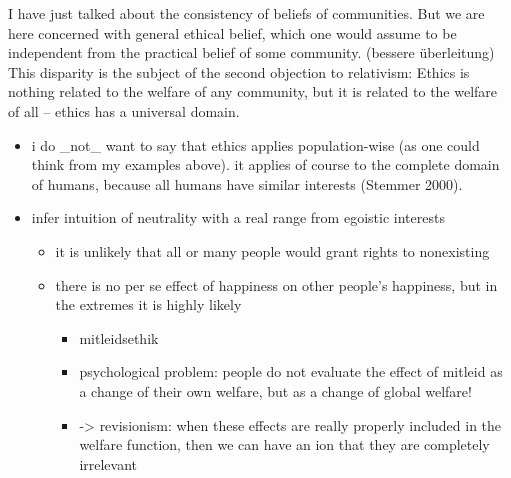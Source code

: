 I have just talked about the consistency of beliefs of communities. But we are here concerned with general ethical belief, which one would assume to be independent from the practical belief of some community. (bessere überleitung) This disparity is the subject of the second objection to relativism: Ethics is nothing related to the welfare of any community, but it is related to the welfare of all – ethics has a universal domain.  

\begin{itemize} \item i do \_not\_ want to say that ethics applies population-wise (as one could think from my examples above). it applies of course to the complete domain of humans, because all humans have similar interests (\label{ref:RNDitrDlHBuIn}Stemmer 2000). \item infer intuition of neutrality with a real range from egoistic interests 

\begin{itemize} \item it is unlikely that all or many people would grant rights to nonexisting \item there is no per se effect of happiness on other people’s happiness, but in the extremes it is highly likely 

\begin{itemize} \item mitleidsethik \item psychological problem: people do not evaluate the effect of mitleid as a change of their own welfare, but as a change of global welfare!  \item {}-{\textgreater} revisionism: when these effects are really properly included in the welfare function, then we can have an ion that they are completely irrelevant \end{itemize} \end{itemize} \end{itemize}